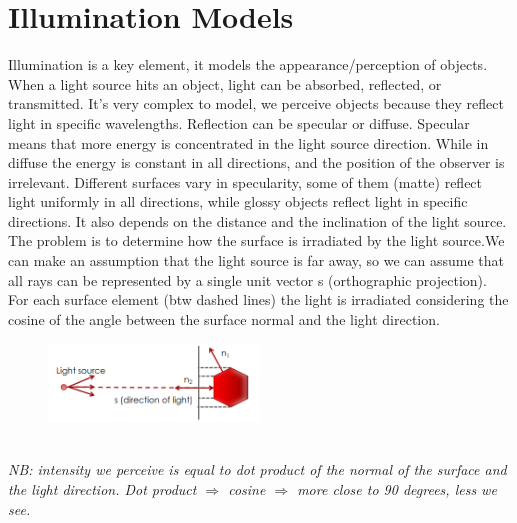 \section{Illumination Models}
Illumination is a key element, it models the appearance/perception of objects.
When a light source hits an object, light can be absorbed, reflected, or transmitted.
It’s very complex to model, we perceive objects because they reflect light in specific wavelengths. Reflection can be specular or diffuse.
Specular means that more energy is concentrated in the light source direction.
While in diffuse the energy is constant in all directions, and the position of the observer is irrelevant.
Different surfaces vary in specularity, some of them (matte) reflect light uniformly in all directions, while glossy objects reflect light in specific directions.
It also depends on the distance and the inclination of the light source.
The problem is to determine how the surface is irradiated by the light source.We can make an assumption that the light source is far away, so we can assume that all rays can be represented by a single unit vector s (orthographic projection).
For each surface element (btw dashed lines) the light is irradiated considering the cosine of the angle between the surface normal and the light direction.
\begin{figure}[h]
    \centering
    \includegraphics[width=0.5\textwidth]{Figures/Illumination.png}
\end{figure}
\\\textit{NB: intensity we perceive is equal to dot product of the normal of the surface and the light direction. Dot product $\Rightarrow$ cosine $\Rightarrow$ more close to 90 degrees, less we see.}
